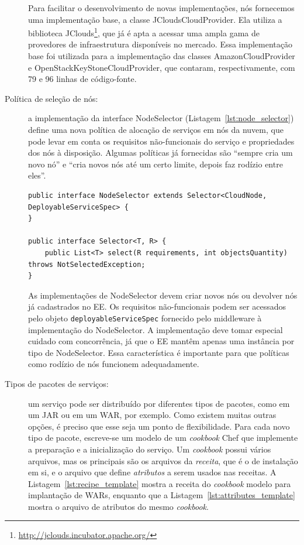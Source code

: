 \begin{description}
Para facilitar o desenvolvimento de novas implementações,
nós fornecemos uma implementação base, a classe \textsf{JCloudsCloudProvider}.
Ela utiliza a biblioteca JClouds\footnote{\url{http://jclouds.incubator.apache.org/}},
que já é apta a acessar uma ampla gama de provedores de infraestrutura disponíveis no mercado.
Essa implementação base foi utilizada para a implementação das classes 
\textsf{AmazonCloudProvider} e \textsf{OpenStackKeyStoneCloudProvider},
que contaram, respectivamente, com 79 e 96 linhas de código-fonte.


\item [Política de seleção de nós:] a implementação da interface \textsf{NodeSelector} (Listagem~\ref{lst:node_selector})
define uma nova política de alocação de serviços em nós da nuvem, que pode levar em conta os requisitos não-funcionais do serviço e 
propriedades dos nós à disposição.
Algumas políticas já fornecidas são ``sempre cria um novo nó'' e 
``cria novos nós até um certo limite, depois faz rodízio entre eles''.

\begin{lstlisting}[frame=trbl, label=lst:node_selector, caption=Interface NodeSelector acompanhada de sua classe pai Selector.]
public interface NodeSelector extends Selector<CloudNode, DeployableServiceSpec> {
}

public interface Selector<T, R> {
    public List<T> select(R requirements, int objectsQuantity) throws NotSelectedException;
}
\end{lstlisting}

As implementações de \textsf{NodeSelector} devem criar novos nós ou devolver nós já cadastrados no EE.
Os requisitos não-funcionais podem ser acessados pelo objeto \texttt{deployableServiceSpec} fornecido pelo
middleware à implementação do \textsf{NodeSelector}.
A implementação deve tomar especial cuidado com concorrência, já que o EE mantêm apenas uma instância
por tipo de \textsf{NodeSelector}. Essa característica é importante para que políticas como
rodízio de nós funcionem adequadamente.


\item [Tipos de pacotes de serviços:] um serviço pode ser distribuído por diferentes tipos de pacotes, como em um JAR ou em um WAR, por 
exemplo. Como existem muitas outras opções, é preciso que esse seja um ponto de flexibilidade. Para cada novo tipo de pacote, escreve-se 
um modelo de um \emph{cookbook} Chef que implemente a preparação e a inicialização do serviço. Um \emph{cookbook} possui vários 
arquivos, mas os principais são os arquivos da \emph{receita}, que é o \script de instalação em si, e o arquivo que define \emph
{atributos} a serem usados nas receitas. A Listagem~\ref{lst:recipe_template} mostra a receita do \emph{cookbook} modelo
para implantação de WARs, enquanto que a Listagem~\ref{lst:attributes_template} mostra o arquivo de atributos do mesmo \emph{cookbook}.


\end{description}
